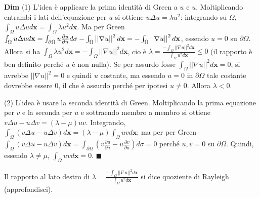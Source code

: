 \documentclass{article}
\begin{document}
\textbf{Dim} (1) L'idea \`{e} applicare la prima identit\`{a} di Green a $u$
e $u$. Moltiplicando entrambi i lati dell'equazione per $u$ si ottiene $%
u\Delta u=\lambda u^{2}$: integrando su $\Omega $, $\int_{\Omega }u\Delta ud%
\mathbf{x}=\int_{\Omega }\lambda u^{2}d\mathbf{x}$. Ma per Green $%
\int_{\Omega }u\Delta ud\mathbf{x}=\int_{\partial \Omega }u\frac{\partial u}{%
\partial n}d\sigma -\int_{\Omega }\left\vert \left\vert \nabla u\right\vert
\right\vert ^{2}d\mathbf{x}=-\int_{\Omega }\left\vert \left\vert \nabla
u\right\vert \right\vert ^{2}d\mathbf{x}$, essendo $u=0$ su $\partial \Omega 
$. Allora si ha $\int_{\Omega }\lambda u^{2}d\mathbf{x}=-\int_{\Omega
}\left\vert \left\vert \nabla u\right\vert \right\vert ^{2}d\mathbf{x}$, cio%
\`{e} $\lambda =\frac{-\int_{\Omega }\left\vert \left\vert \nabla
u\right\vert \right\vert ^{2}d\mathbf{x}}{\int_{\Omega }u^{2}d\mathbf{x}}%
\leq 0$ (il rapporto \`{e} ben definito perch\'{e} $u$ \`{e} non nulla). Se
per assurdo fosse $\int_{\Omega }\left\vert \left\vert \nabla u\right\vert
\right\vert ^{2}d\mathbf{x}=0$, si avrebbe $\left\vert \left\vert \nabla
u\right\vert \right\vert ^{2}=0$ e quindi $u$ costante, ma essendo $u=0$ in $%
\partial \Omega $ tale costante dovrebbe essere $0$, il che \`{e} assurdo
perch\'{e} per ipotesi $u\neq 0$. Allora $\lambda <0$.

(2) L'idea \`{e} usare la seconda identit\`{a} di Green. Moltiplicando la
prima equazione per $v$ e la seconda per $u$ e sottraendo membro a membro si
ottiene $v\Delta u-u\Delta v=\left( \lambda -\mu \right) uv$. Integrando, $%
\int_{\Omega }\left( v\Delta u-u\Delta v\right) d\mathbf{x}=\left( \lambda
-\mu \right) \int_{\Omega }uvd\mathbf{x}$; ma per per Green $\int_{\Omega
}\left( v\Delta u-u\Delta v\right) d\mathbf{x=}\int_{\partial \Omega }\left(
v\frac{\partial u}{\partial n}-u\frac{\partial v}{\partial n}\right) d\sigma
=0$ perch\'{e} $u,v=0$ su $\partial \Omega $. Quindi, essendo $\lambda \neq
\mu $, $\int_{\Omega }uvd\mathbf{x}=0$. $\blacksquare $

Il rapporto al lato destro di $\lambda =\frac{-\int_{\Omega }\left\vert
\left\vert \nabla u\right\vert \right\vert ^{2}d\mathbf{x}}{\int_{\Omega
}u^{2}d\mathbf{x}}$ si dice quoziente di Rayleigh (approfondisci).
\end{document}
